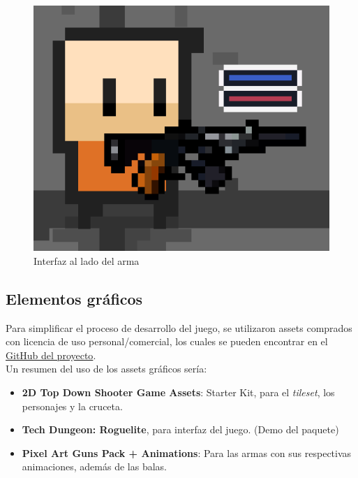 \documentclass[12pt]{article}
\begin{document}
        \begin{figure}[H]
            \centering
            \includegraphics[scale = 0.5]{Images/UI descartada.png}
            \caption{Interfaz al lado del arma}
            \label{fig:UI descartada}
        \end{figure}
        
    \subsection{Elementos gráficos}
        
        Para simplificar el proceso de desarrollo del juego, se utilizaron assets comprados con licencia de uso personal/comercial, los cuales se pueden encontrar en el \href{https://github.com/JesusJMUJI/TopDownShooterGame}{GitHub del proyecto}.\\
        
        Un resumen del uso de los assets gráficos sería:
        \begin{itemize}
            \item \textbf{2D Top Down Shooter Game Assets}: Starter Kit, para el \textit{tileset}, los personajes y la cruceta.
            \item \textbf{Tech Dungeon: Roguelite}, para interfaz del juego. (Demo del paquete)
            \item \textbf{Pixel Art Guns Pack + Animations}: Para las armas con sus respectivas animaciones, además de las balas.
        \end{itemize}
        
\end{document}
